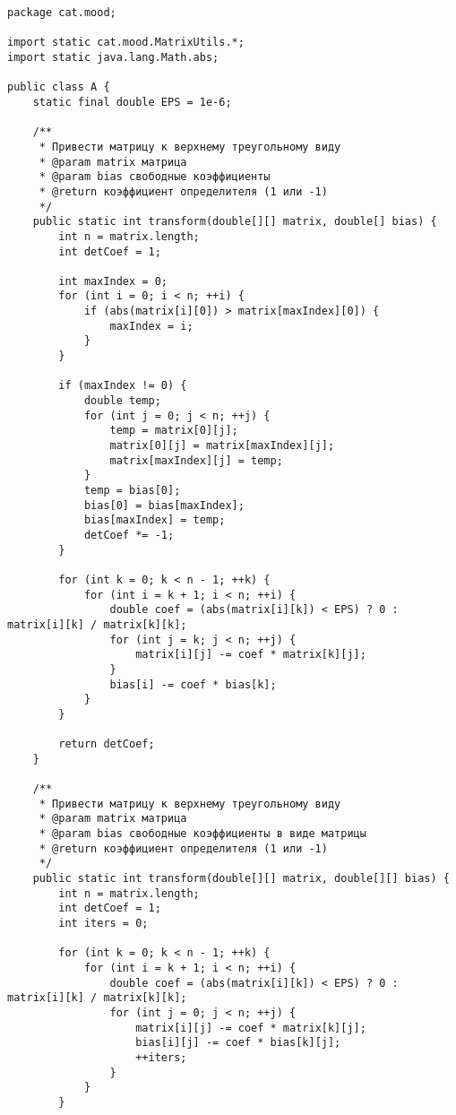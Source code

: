 \begin{verbatim}
package cat.mood;

import static cat.mood.MatrixUtils.*;
import static java.lang.Math.abs;

public class A {
    static final double EPS = 1e-6;

    /**
     * Привести матрицу к верхнему треугольному виду
     * @param matrix матрица
     * @param bias свободные коэффициенты
     * @return коэффициент определителя (1 или -1)
     */
    public static int transform(double[][] matrix, double[] bias) {
        int n = matrix.length;
        int detCoef = 1;

        int maxIndex = 0;
        for (int i = 0; i < n; ++i) {
            if (abs(matrix[i][0]) > matrix[maxIndex][0]) {
                maxIndex = i;
            }
        }

        if (maxIndex != 0) {
            double temp;
            for (int j = 0; j < n; ++j) {
                temp = matrix[0][j];
                matrix[0][j] = matrix[maxIndex][j];
                matrix[maxIndex][j] = temp;
            }
            temp = bias[0];
            bias[0] = bias[maxIndex];
            bias[maxIndex] = temp;
            detCoef *= -1;
        }

        for (int k = 0; k < n - 1; ++k) {
            for (int i = k + 1; i < n; ++i) {
                double coef = (abs(matrix[i][k]) < EPS) ? 0 : matrix[i][k] / matrix[k][k];
                for (int j = k; j < n; ++j) {
                    matrix[i][j] -= coef * matrix[k][j];
                }
                bias[i] -= coef * bias[k];
            }
        }

        return detCoef;
    }

    /**
     * Привести матрицу к верхнему треугольному виду
     * @param matrix матрица
     * @param bias свободные коэффициенты в виде матрицы
     * @return коэффициент определителя (1 или -1)
     */
    public static int transform(double[][] matrix, double[][] bias) {
        int n = matrix.length;
        int detCoef = 1;
        int iters = 0;

        for (int k = 0; k < n - 1; ++k) {
            for (int i = k + 1; i < n; ++i) {
                double coef = (abs(matrix[i][k]) < EPS) ? 0 : matrix[i][k] / matrix[k][k];
                for (int j = 0; j < n; ++j) {
                    matrix[i][j] -= coef * matrix[k][j];
                    bias[i][j] -= coef * bias[k][j];
                    ++iters;
                }
            }
        }


\end{verbatim}
